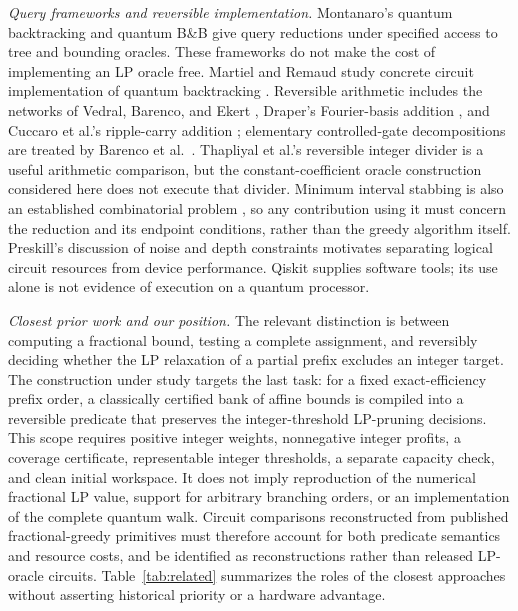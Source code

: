 \documentclass[conference]{IEEEtran}
\begin{document}
\textit{Query frameworks and reversible implementation.} Montanaro's quantum backtracking \cite{ref35} and quantum B\&B \cite{ref24} give query reductions under specified access to tree and bounding oracles. These frameworks do not make the cost of implementing an LP oracle free. Martiel and Remaud study concrete circuit implementation of quantum backtracking \cite{martiel2019}. Reversible arithmetic includes the networks of Vedral, Barenco, and Ekert \cite{vedral1996}, Draper's Fourier-basis addition \cite{draper2000}, and Cuccaro et al.'s ripple-carry addition \cite{cuccaro2004}; elementary controlled-gate decompositions are treated by Barenco et al.\ \cite{barenco1995}. Thapliyal et al.'s reversible integer divider \cite{thapliyal2016} is a useful arithmetic comparison, but the constant-coefficient oracle construction considered here does not execute that divider. Minimum interval stabbing is also an established combinatorial problem \cite{erickson2019algorithms}, so any contribution using it must concern the reduction and its endpoint conditions, rather than the greedy algorithm itself. Preskill's discussion of noise and depth constraints \cite{ref31} motivates separating logical circuit resources from device performance. Qiskit \cite{ref33} supplies software tools; its use alone is not evidence of execution on a quantum processor.

\textit{Closest prior work and our position.} The relevant distinction is between computing a fractional bound, testing a complete assignment, and reversibly deciding whether the LP relaxation of a partial prefix excludes an integer target. The construction under study targets the last task: for a fixed exact-efficiency prefix order, a classically certified bank of affine bounds is compiled into a reversible predicate that preserves the integer-threshold LP-pruning decisions. This scope requires positive integer weights, nonnegative integer profits, a coverage certificate, representable integer thresholds, a separate capacity check, and clean initial workspace. It does not imply reproduction of the numerical fractional LP value, support for arbitrary branching orders, or an implementation of the complete quantum walk. Circuit comparisons reconstructed from published fractional-greedy primitives \cite{wilkening2025,wilkening2025code} must therefore account for both predicate semantics and resource costs, and be identified as reconstructions rather than released LP-oracle circuits. Table~\ref{tab:related} summarizes the roles of the closest approaches without asserting historical priority or a hardware advantage.
\end{document}
